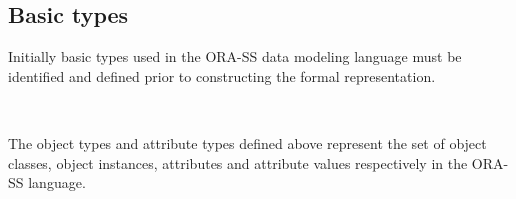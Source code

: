 \documentclass{entcs}
\begin{document}
\subsection{Basic types}
Initially basic types used in the ORA-SS data modeling language
must be identified and defined prior to constructing the formal
representation. %
\begin{small}
\begin{zed}
  \\
\end{zed}
\end{small}
The object types and attribute types defined above represent the
set of object classes, object instances, attributes and attribute
values respectively in the ORA-SS language. %
\end{document}
